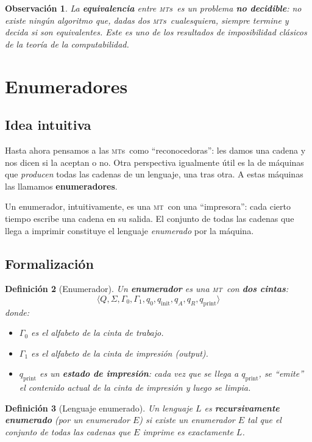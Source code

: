 \documentclass[11pt,a4paper]{article}
\theoremstyle{definicion}
\newtheorem{definicion}{Definición}[section]
\newtheorem{observacion}[definicion]{Observación}
\newcommand{\MT}{\textsc{mt}}
\newcommand{\MTs}{\textsc{mt}s}
\begin{document}
\begin{observacion}
La \textbf{equivalencia} entre \MTs\ es un problema \textbf{no decidible}: no existe ningún algoritmo que, dadas dos \MTs\ cualesquiera, siempre termine y decida si son equivalentes. Este es uno de los resultados de imposibilidad clásicos de la teoría de la computabilidad.
\end{observacion}

\section{Enumeradores}

\subsection{Idea intuitiva}

Hasta ahora pensamos a las \MTs\ como ``reconocedoras'': les damos una cadena y nos dicen si la aceptan o no. Otra perspectiva igualmente útil es la de máquinas que \emph{producen} todas las cadenas de un lenguaje, una tras otra. A estas máquinas las llamamos \textbf{enumeradores}.

Un enumerador, intuitivamente, es una \MT\ con una ``impresora'': cada cierto tiempo escribe una cadena en su salida. El conjunto de todas las cadenas que llega a imprimir constituye el lenguaje \emph{enumerado} por la máquina.

\subsection{Formalización}

\begin{definicion}[Enumerador]
Un \textbf{enumerador} es una \MT\ con \textbf{dos cintas}:
\[
\langle Q, \Sigma, \Gamma_0, \Gamma_1, q_0, q_{\text{init}}, q_A, q_R, q_{\text{print}} \rangle
\]
donde:
\begin{itemize}
    \item $\Gamma_0$ es el alfabeto de la cinta de trabajo.
    \item $\Gamma_1$ es el alfabeto de la cinta de impresión (output).
    \item $q_{\text{print}}$ es un \textbf{estado de impresión}: cada vez que se llega a $q_{\text{print}}$, se ``emite'' el contenido actual de la cinta de impresión y luego se limpia.
\end{itemize}
\end{definicion}

\begin{definicion}[Lenguaje enumerado]
Un lenguaje $L$ es \textbf{recursivamente enumerado} (por un enumerador $E$) si existe un enumerador $E$ tal que el conjunto de todas las cadenas que $E$ imprime es exactamente $L$.
\end{definicion}
\end{document}

